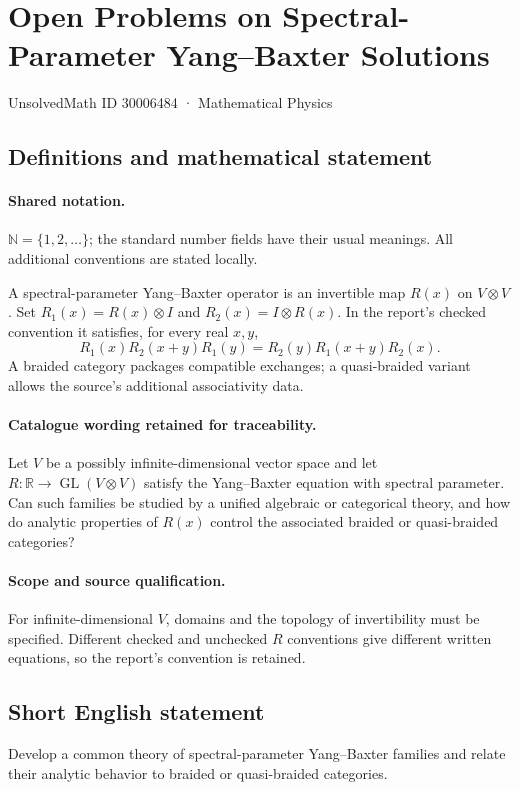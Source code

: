 \documentclass[11pt]{article}
\begin{document}
\setcounter{section}{30006483}
\section{Open Problems on Spectral-Parameter Yang–Baxter Solutions}\label{30006484}
{\small UnsolvedMath ID 30006484 · Mathematical Physics}
\subsection{Definitions and mathematical statement}

\paragraph{Shared notation.}$\mathbb N=\{1,2,\ldots\}$; the standard number fields have their usual meanings. All additional conventions are stated locally.


A spectral-parameter Yang--Baxter operator is an invertible map $R(x)$ on $V\otimes V$. Set $R_1(x)=R(x)\otimes I$ and $R_2(x)=I\otimes R(x)$. In the report's checked convention it satisfies, for every real $x,y$,
\[
R_1(x)R_2(x+y)R_1(y)=R_2(y)R_1(x+y)R_2(x).
\]
A braided category packages compatible exchanges; a quasi-braided variant allows the source's additional associativity data.

\paragraph{Catalogue wording retained for traceability.}
Let $V$ be a possibly infinite-dimensional vector space and let $R:\mathbb R\to\operatorname{GL}(V\otimes V)$ satisfy the Yang–Baxter equation with spectral parameter. Can such families be studied by a unified algebraic or categorical theory, and how do analytic properties of $R(x)$ control the associated braided or quasi-braided categories?

\paragraph{Scope and source qualification.}For infinite-dimensional $V$, domains and the topology of invertibility must be specified. Different checked and unchecked $R$ conventions give different written equations, so the report's convention is retained.
\subsection{Short English statement}
Develop a common theory of spectral-parameter Yang--Baxter families and relate their analytic behavior to braided or quasi-braided categories.
\end{document}
